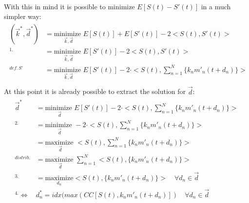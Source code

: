 \documentclass[11pt]{scrartcl} %
\begin{document}
  With this in mind it is possible to minimize \(E[S{\scriptstyle (t)}-S'{\scriptstyle (t)}]\) in a much simpler way:
  \begin{align*}
    \begin{aligned}
      (\vec{k}^*, \vec{d}^*) &= \underset{\vec{k}, \vec{d}}{\text{minimize }} E[S{\scriptstyle (t)}] + E[S'{\scriptstyle (t)}] - 2<S{\scriptstyle (t)}, S'{\scriptstyle (t)}>\\
      ^{1.}&= \underset{\vec{k}, \vec{d}}{\text{minimize }} E[S'{\scriptstyle (t)}] - 2<S{\scriptstyle (t)}, S'{\scriptstyle (t)}>\\
      ^{def.\,S'}&= \underset{\vec{k}, \vec{d}}{\text{minimize }} E[S'{\scriptstyle (t)}] - 2\cdot <S{\scriptstyle (t)},\sum_{n=1}^N\{k_nm'_n{\scriptstyle (t+d_n)}\}>\\
      \end{aligned}
  \end{align*}
  At this point it is already possible to extract the solution for \(\vec{d}\):
  \begin{align*}
    \begin{aligned}
      \vec{d}^* &=  \underset{\vec{d}}{\text{minimize }} E[S'{\scriptstyle (t)}] - 2\cdot <S{\scriptstyle (t)},\sum_{n=1}^N\{k_nm'_n{\scriptstyle (t+d_n)}\}>\\
      ^{2.}&=  \underset{\vec{d}}{\text{minimize }} - 2\cdot <S{\scriptstyle (t)},\sum_{n=1}^N\{k_nm'_n{\scriptstyle (t+d_n)}\}>\\
      &=  \underset{\vec{d}}{\text{maximize }}  <S{\scriptstyle (t)},\sum_{n=1}^N\{k_nm'_n{\scriptstyle (t+d_n)}\}>\\
      ^{distrib.}&=  \underset{\vec{d}}{\text{maximize }}  \sum_{n=1}^N<S{\scriptstyle (t)},\{k_nm'_n{\scriptstyle (t+d_n)}\}>\\
      ^{3.}&=  \underset{d_n}{\text{maximize}}<S{\scriptstyle (t)},\{k_nm'_n{\scriptstyle (t+d_n)}\}> \quad \forall d_n \in \vec{d}\\
      ^{4.}\iff &d_n^* = idx(max(CC[S{\scriptstyle (t)}, k_nm'_n{\scriptstyle (t+d_n)}]) \quad \forall d_n \in \vec{d}\\
      \end{aligned}
  \end{align*}
\end{document}
